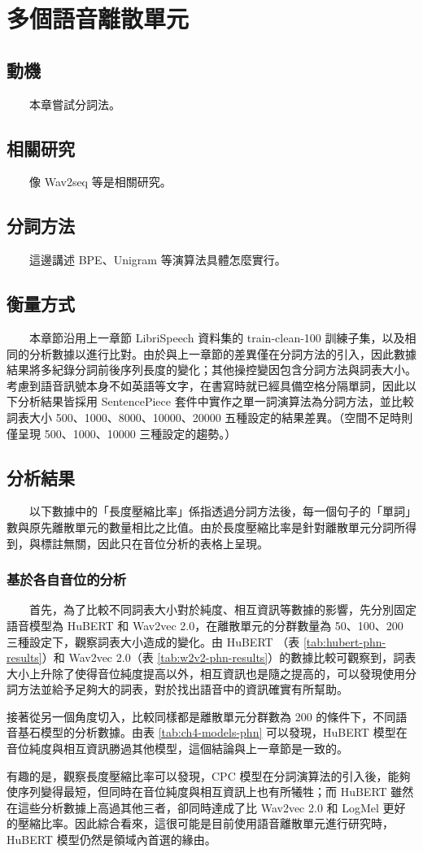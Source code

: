 
\chapter{多個語音離散單元}   

    {   
{     
\section{動機}            　　本章嘗試分詞法。
\section{相關研究} 　　像 Wav2seq \cite{wu_wav2seq_2023}  等是相關研究。
\section{分詞方法} 　　這邊講述 BPE、Unigram 等演算法具體怎麼實行。}
\section{衡量方式}
　　本章節沿用上一章節 LibriSpeech 資料集的 train-clean-100 訓練子集，以及相同的分析數據以進行比對。由於與上一章節的差異僅在分詞方法的引入，因此數據結果將多紀錄分詞前後序列長度的變化；其他操控變因包含分詞方法與詞表大小。考慮到語音訊號本身不如英語等文字，在書寫時就已經具備空格分隔單詞，因此以下分析結果皆採用 SentencePiece 套件中實作之單一詞演算法為分詞方法，並比較詞表大小 500、1000、8000、10000、20000 五種設定的結果差異。（空間不足時則僅呈現 500、1000、10000 三種設定的趨勢。）  }  %
\section{分析結果} 
{
　　以下數據中的「長度壓縮比率」係指透過分詞方法後，每一個句子的「單詞」數與原先離散單元的數量相比之比值。由於長度壓縮比率是針對離散單元分詞所得到，與標註無關，因此只在音位分析的表格上呈現。 }
\subsection{基於各自音位的分析}
　　首先，為了比較不同詞表大小對於純度、相互資訊等數據的影響，先分別固定語音模型為 HuBERT 和 Wav2vec 2.0，在離散單元的分群數量為 50、100、200 三種設定下，觀察詞表大小造成的變化。由 HuBERT （表 \ref{tab:hubert-phn-results}）和 Wav2vec 2.0（表 \ref{tab:w2v2-phn-results}）的數據比較可觀察到，詞表大小上升除了使得音位純度提高以外，相互資訊也是隨之提高的，可以發現使用分詞方法並給予足夠大的詞表，對於找出語音中的資訊確實有所幫助。    \par %
        接著從另一個角度切入，比較同樣都是離散單元分群數為 200 的條件下，不同語音基石模型的分析數據。由表 \ref{tab:ch4-models-phn} 可以發現，HuBERT 模型在音位純度與相互資訊勝過其他模型，這個結論與上一章節是一致的。 \par %
        有趣的是，觀察長度壓縮比率可以發現，CPC 模型在分詞演算法的引入後，能夠使序列變得最短，但同時在音位純度與相互資訊上也有所犧牲；而 HuBERT 雖然在這些分析數據上高過其他三者，卻同時達成了比 Wav2vec 2.0 和 LogMel 更好的壓縮比率。因此綜合看來，這很可能是目前使用語音離散單元進行研究時，HuBERT 模型仍然是領域內首選的緣由。

